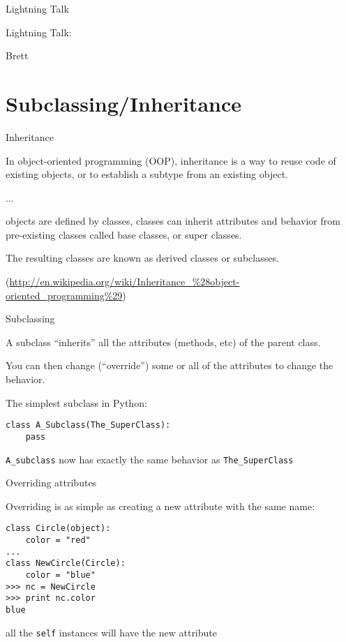 \documentclass{beamer}
\begin{document}
\begin{frame}{Lightning Talk}

{\centering

\vfill
{\LARGE Lightning Talk:  }

\vfill
{\Huge Brett}

\vfill
}
\end{frame}

\section{Subclassing/Inheritance}

\begin{frame}[fragile]{Inheritance}

In object-oriented programming (OOP), inheritance is a way to reuse code of
existing objects, or to establish a subtype from an existing object.

\vfill
...

\vfill
objects are defined by classes, classes can inherit attributes and behavior
from pre-existing classes called base classes, or super classes.

\vfill
The resulting classes are known as derived classes or subclasses.

\vfill
(\url{http://en.wikipedia.org/wiki/Inheritance_%28object-oriented_programming%29})
\end{frame} 

\begin{frame}[fragile]{Subclassing}

A subclass ``inherits'' all the attributes (methods, etc) of the parent class.

\vfill
You can then change (``override'') some or all of the attributes to change the behavior.

\vfill
The simplest subclass in Python:

\begin{verbatim}
class A_Subclass(The_SuperClass):
    pass
\end{verbatim}

\vfill
\verb|A_subclass| now has exactly the same behavior as \verb|The_SuperClass|

\end{frame} 

\begin{frame}[fragile]{Overriding attributes}

{\Large Overriding is as simple as creating a new attribute with the same name:}

\vfill
\begin{verbatim}
class Circle(object):
    color = "red"
...
class NewCircle(Circle):
    color = "blue"
>>> nc = NewCircle
>>> print nc.color
blue
\end{verbatim}

\vfill
all the \verb|self| instances will have the new attribute
\end{frame} 
\end{document}
